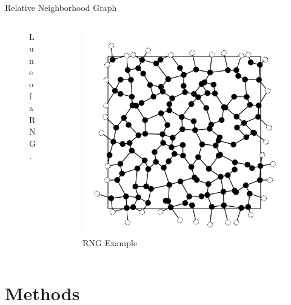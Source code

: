 \documentclass{beamer}
\begin{document}
        \begin{frame}{Relative Neighborhood Graph}
            \begin{columns}[b]
                \begin{column}{5cm}
                    \begin{figure}[htbp]
                        \centering
                        
                        \caption
                        {
                            Lune of a RNG.
                        }
                    \end{figure}
                \end{column}
                \begin{column}{5cm}
                    \begin{figure}[htbp]
                        \centering
                        \includegraphics[width=1\textwidth]{images/RNG/L12S03.pdf}
                        \caption
                        {
                            RNG Example
                        }
                    \end{figure}
                \end{column}
            \end{columns}
        \end{frame}

\section{Methods}
\end{document}
